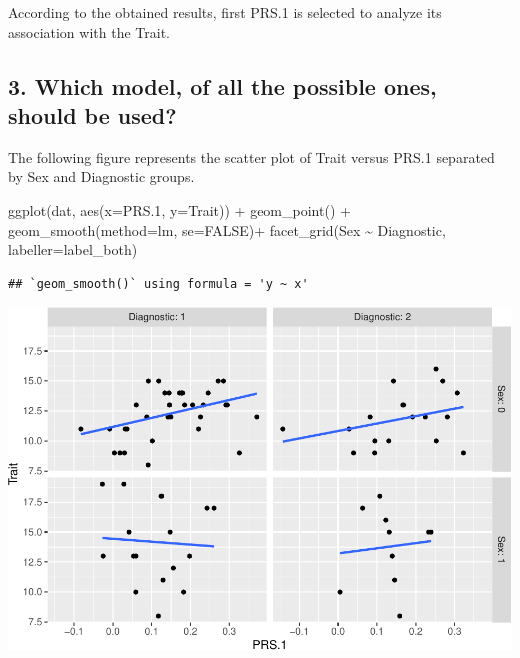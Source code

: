 \documentclass[
]{article}
\newenvironment{Shaded}{\begin{snugshade}}{\end{snugshade}}
\newcommand{\AttributeTok}[1]{\textcolor[rgb]{0.77,0.63,0.00}{#1}}
\newcommand{\ConstantTok}[1]{\textcolor[rgb]{0.00,0.00,0.00}{#1}}
\newcommand{\FloatTok}[1]{\textcolor[rgb]{0.00,0.00,0.81}{#1}}
\newcommand{\FunctionTok}[1]{\textcolor[rgb]{0.00,0.00,0.00}{#1}}
\newcommand{\NormalTok}[1]{#1}
\newcommand{\SpecialCharTok}[1]{\textcolor[rgb]{0.00,0.00,0.00}{#1}}
\begin{document}
According to the obtained results, first PRS.1 is selected to analyze
its association with the Trait.

\hypertarget{which-model-of-all-the-possible-ones-should-be-used}{%
\subsection{3. Which model, of all the possible ones, should be
used?}\label{which-model-of-all-the-possible-ones-should-be-used}}

The following figure represents the scatter plot of Trait versus PRS.1
separated by Sex and Diagnostic groups.

\begin{Shaded}
\begin{Highlighting}[]
\FunctionTok{ggplot}\NormalTok{(dat, }\FunctionTok{aes}\NormalTok{(}\AttributeTok{x=}\NormalTok{PRS}\FloatTok{.1}\NormalTok{, }\AttributeTok{y=}\NormalTok{Trait)) }\SpecialCharTok{+}
  \FunctionTok{geom\_point}\NormalTok{() }\SpecialCharTok{+}
  \FunctionTok{geom\_smooth}\NormalTok{(}\AttributeTok{method=}\NormalTok{lm, }\AttributeTok{se=}\ConstantTok{FALSE}\NormalTok{)}\SpecialCharTok{+}
  \FunctionTok{facet\_grid}\NormalTok{(Sex }\SpecialCharTok{\textasciitilde{}}\NormalTok{ Diagnostic, }\AttributeTok{labeller=}\NormalTok{label\_both)}
\end{Highlighting}
\end{Shaded}

\begin{verbatim}
## `geom_smooth()` using formula = 'y ~ x'
\end{verbatim}

\includegraphics{WorkingExample3_code_files/figure-latex/unnamed-chunk-6-1.pdf}
\end{document}
